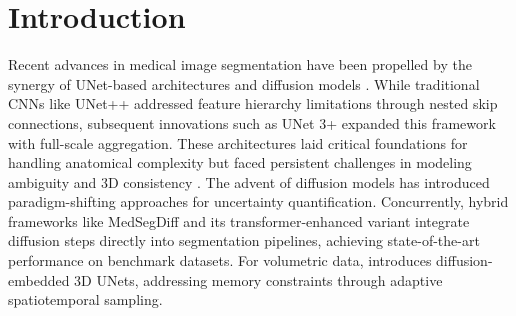 \section{Introduction}
\begin{multicols}{2}
\noindent
Recent advances in medical image segmentation have been propelled by the synergy of UNet-based architectures \cite{zhou2020unet++, huang2021unet3+} and diffusion models \cite{liu2024biomedical, shi2025diffusion}. While traditional CNNs like UNet++ \cite{zhou2020unet++} addressed feature hierarchy limitations through nested skip connections, subsequent innovations such as UNet 3+ \cite{huang2021unet3+} expanded this framework with full-scale aggregation. These architectures laid critical foundations for handling anatomical complexity but faced persistent challenges in modeling ambiguity \cite{rahman2023ambiguous} and 3D consistency \cite{hu2024diffunet}.
The advent of diffusion models has introduced paradigm-shifting approaches for uncertainty quantification. Concurrently, hybrid frameworks like MedSegDiff \cite{wu2023medsegdiff} and its transformer-enhanced variant \cite{wu2023medsegdiffv2} integrate diffusion steps directly into segmentation pipelines, achieving state-of-the-art performance on benchmark datasets. For volumetric data, \cite{hu2024diffunet} introduces diffusion-embedded 3D UNets, addressing memory constraints through adaptive spatiotemporal sampling.
\end{multicols}